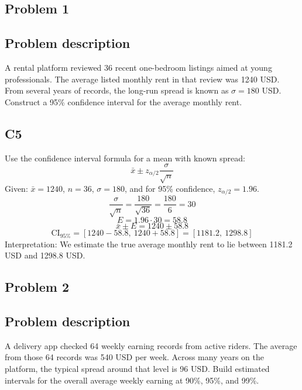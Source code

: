 


	\begin{ExamProblems}
		\item
		\subsection*{Problem 1}
		\subsection*{Problem description}
		A rental platform reviewed 36 recent one-bedroom listings aimed at young professionals.
		The average listed monthly rent in that review was 1240 USD.
		From several years of records, the long-run spread is known as $\sigma=180$ USD.
		Construct a 95\% confidence interval for the average monthly rent.

		\subsection*{C5}
		Use the confidence interval formula for a mean with known spread:
		\[
		\bar{x} \pm z_{\alpha/2}\frac{\sigma}{\sqrt{n}}
		\]
		Given: $\bar{x}=1240$, $n=36$, $\sigma=180$, and for 95\% confidence, $z_{\alpha/2}=1.96$.
		\[
		\frac{\sigma}{\sqrt{n}}=\frac{180}{\sqrt{36}}=\frac{180}{6}=30
		\]
		\[
		E=1.96\cdot 30=58.8
		\]
		\[
		\bar{x}\pm E=1240\pm 58.8
		\]
		\[
		\text{CI}_{95\%}=[1240-58.8,\ 1240+58.8]=[1181.2,\ 1298.8]
		\]
		Interpretation: We estimate the true average monthly rent to lie between 1181.2 USD and 1298.8 USD.

		\newpage
		\item
		\subsection*{Problem 2}
		\subsection*{Problem description}
		A delivery app checked 64 weekly earning records from active riders.
		The average from those 64 records was 540 USD per week.
		Across many years on the platform, the typical spread around that level is 96 USD.
		Build estimated intervals for the overall average weekly earning at 90\%, 95\%, and 99\%.


\end{ExamProblems}

